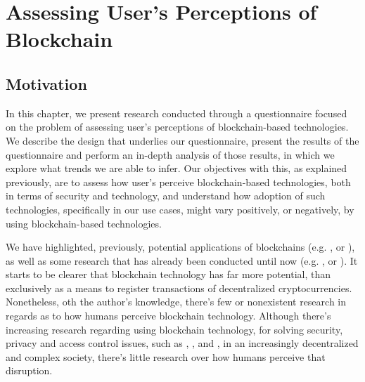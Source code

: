 \chapter{Assessing User's Perceptions of Blockchain}
\label{chap:study}

\section{Motivation}

In this chapter, we present research conducted through a questionnaire focused on the problem of assessing user's perceptions of blockchain-based technologies. We describe the design that underlies our questionnaire, present the results of the questionnaire and perform an in-depth analysis of those results, in which we explore what trends we are able to infer. Our objectives with this, as explained previously, are to assess how user's perceive blockchain-based technologies, both in terms of security and technology, and understand how adoption of such technologies, specifically in our use cases, might vary positively, or negatively, by using blockchain-based technologies.

We have highlighted, previously, potential applications of blockchains (e.g. \cite{pilkington_blockchain_2016}, \cite{crosby_blockchain_2016} or \cite{underwood_blockchain_2016}), as well as some research that has already been conducted until now (e.g. \cite{biswas_securing_2016}, \cite{ouaddah_fairaccess:_2017} or \cite{fotiou_decentralized_2016}). It starts to be clearer that blockchain technology has far more potential, than exclusively as a means to register transactions of decentralized cryptocurrencies. Nonetheless, oth the author's knowledge, there's few or nonexistent research in regards as to how humans perceive blockchain technology. Although there's increasing research regarding using blockchain technology, for solving security, privacy and access control issues, such as \cite{maesa_blockchain_2017}, \cite{ouaddah_access_2017}, \cite{dorri_blockchain_2017} and \cite{yue_healthcare_2016}, in an increasingly decentralized and complex society, there's little research over how humans perceive that disruption.

